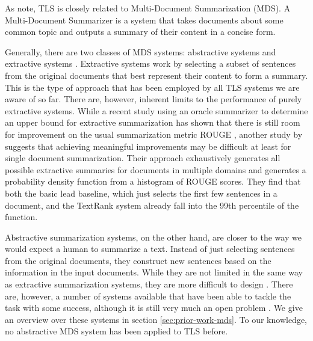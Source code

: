 \documentclass[a4paper,BCOR=10mm]{report}
\numberwithin{lemma}{chapter}
\numberwithin{definition}{chapter}
\begin{document}
As \citet{markert} note, TLS is closely related to Multi-Document Summarization (MDS).
A Multi-Document Summarizer is a system that takes documents about some common topic and outputs a summary of their content in a concise form.

Generally, there are two classes of MDS systems: abstractive systems and extractive systems \citep{a-brief-survey}. Extractive systems work by selecting a subset of sentences from the original documents that best represent their content to form a summary. This is the type of approach that has been employed by all TLS systems we are aware of so far.
There are, however, inherent limits to the performance of purely extractive systems. While a recent study \citep{hirao+nishino} using an oracle summarizer to determine an upper bound for extractive summarization has shown that there is still room for improvement on the usual summarization metric ROUGE \citep{rouge}, another study by \citet{ceylan+mihalcea} suggests that achieving meaningful improvements may be difficult at least for single document summarization. Their approach exhaustively generates all possible extractive summaries for documents in multiple domains and generates a probability density function from a histogram of ROUGE scores. They find that both the basic lead baseline, which just selects the first few sentences in a document, and the TextRank system \citep{textrank} already fall into the 99th percentile of the function.

Abstractive summarization systems, on the other hand, are closer to the way we would expect a human to summarize a text. Instead of just selecting sentences from the original documents, they construct new sentences based on the information in the input documents. While they are not limited in the same way as extractive summarization systems, they are more difficult to design \citep{recent-advances, a-brief-survey}.
There are, however, a number of systems available that have been able to tackle the task with some success, although it is still very much an open problem \citep{recent-advances}. We give an overview over these systems in section \ref{sec:prior-work-mds}.
To our knowledge, no abstractive MDS system has been applied to TLS before.

\end{document}
